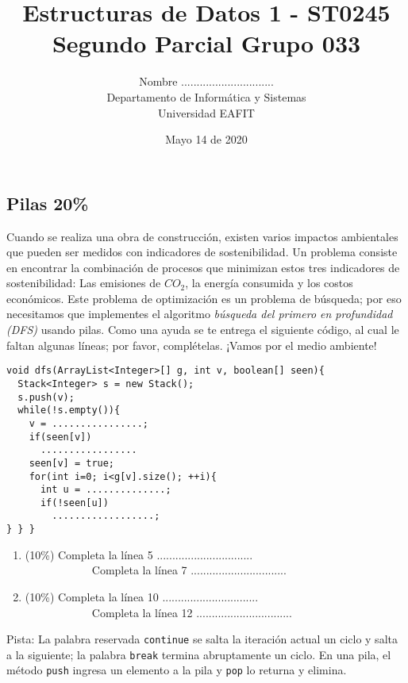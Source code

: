 \documentclass[10 pt]{article}
\title{\textbf {Estructuras de Datos 1 - ST0245\\Segundo Parcial Grupo 033}}
\author{Nombre ..............................\\
		Departamento de Informática y Sistemas\\
		Universidad EAFIT\\}
\date{Mayo 14 de 2020}
\begin{document}
\lstset{escapechar=@,style=customc, numbers=left, stepnumber = 1} 
\maketitle
\begin{multicols}{2}
\section{Pilas 20\%}

Cuando se realiza una obra de construcción, existen varios impactos ambientales que pueden ser medidos con indicadores de sostenibilidad. Un problema consiste en encontrar la combinación de procesos que minimizan estos tres indicadores de sostenibilidad: Las emisiones de $CO_2$, la energía consumida y los costos económicos. Este problema de optimización es un problema de búsqueda; por eso necesitamos que 
implementes el algoritmo \emph{búsqueda del primero en profundidad (DFS)} usando pilas. Como una ayuda se te entrega el siguiente código, al cual le faltan algunas líneas; por favor, complételas. ¡Vamos por el medio ambiente!

{\small
\begin{lstlisting}
void dfs(ArrayList<Integer>[] g, int v, boolean[] seen){
  Stack<Integer> s = new Stack();
  s.push(v);
  while(!s.empty()){
    v = ................;
    if(seen[v])
      .................
    seen[v] = true;
    for(int i=0; i<g[v].size(); ++i){
      int u = ..............;
      if(!seen[u])
        ..................;
} } }
\end{lstlisting}
}
\begin{enumerate}[label=\Alph*]
	\item (10\%) Completa la línea 5 ............................... \\
	\ \ \ \ \ \ \ \ \ \ \ \ Completa la línea 7 ...............................
	\item (10\%) Completa la línea 10 ............................... \\
	\ \ \ \ \ \ \ \ \ \ \ \ Completa la línea 12 ...............................
\end{enumerate}

Pista: La palabra reservada \texttt{continue} se salta la iteración actual un ciclo y salta a la siguiente; la palabra \texttt{break} termina abruptamente un ciclo. En una pila, el método \texttt{push} ingresa un elemento a la pila y \texttt{pop} lo returna y elimina.


\end{multicols}
\end{document}
